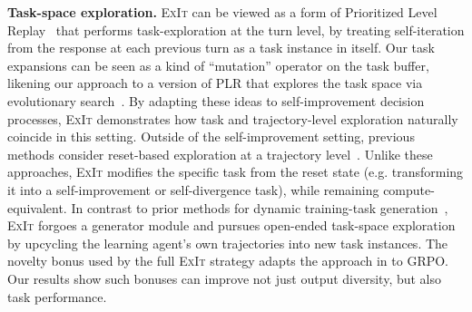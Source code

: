 \documentclass[10pt]{article} %
\newcommand{\methodname}{\textsc{ExIt}}
\begin{document}
\textbf{Task-space exploration.} \methodname{} can be viewed as a form of Prioritized Level Replay~\citet[PLR]{jiang2021prioritized, jiang2021replay} that performs task-exploration at the turn level, by treating self-iteration from the response at each previous turn as a task instance in itself. Our task expansions can be seen as a kind of ``mutation'' operator on the task buffer, likening our approach to a version of PLR that explores the task space via evolutionary search~\citep{parker2022evolving}. By adapting these ideas to self-improvement decision processes, \methodname{} demonstrates how task and trajectory-level exploration naturally coincide in this setting. Outside of the self-improvement setting, previous methods consider reset-based exploration at a trajectory level~\citep{ecoffet2019go, kazemnejad2024vineppo, foster2025learning, zheng2025first}. Unlike these approaches, \methodname{} modifies the specific task from the reset state (e.g. transforming it into a self-improvement or self-divergence task), while remaining compute-equivalent. In contrast to prior methods for dynamic training-task generation~\citep{sukhbaatar2017intrinsic, wang2019poet, wang2020enhanced, dennis2020emergent, zhang2023omni, faldor2024omni, zhao2025absolute}, \methodname{} forgoes a generator module and pursues open-ended task-space exploration~\citep{jiang2023general} by upcycling the learning agent's own trajectories into new task instances. The novelty bonus used by the full \methodname{} strategy adapts the approach in \citet{chung2025modifying} to GRPO. Our results show such bonuses can improve not just output diversity, but also task performance.
\end{document}
